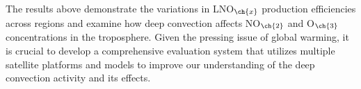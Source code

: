 {The results above demonstrate the variations in LNO$_{\ch{x}}$ production efficiencies across regions and examine how deep convection affects NO$_{\ch{2}}$ and O$_{\ch{3}}$ concentrations in the troposphere.
Given the pressing issue of global warming, it is crucial to develop a comprehensive evaluation system that utilizes multiple satellite platforms and models to improve our understanding of the deep convection activity and its effects.
}

